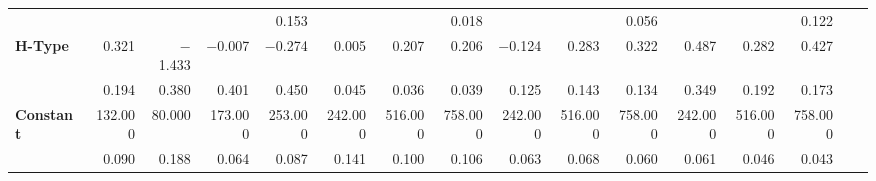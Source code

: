 \begin{tabular}{@{\extracolsep{5pt}}lrrrrrrrrrrrrrrr}
{\bf } & \phantom{***} & \phantom{***} & \phantom{***} & 0.153\phantom{\phantom{)}***} & \phantom{***} & \phantom{***} & 0.018\phantom{\phantom{)}***} & \phantom{***} & \phantom{***} & 0.056\phantom{\phantom{)}***} & \phantom{***} & \phantom{***} & 0.122\phantom{\phantom{)}***} \\
{\bf H-Type} & 0.321\phantom{\phantom{)}***} & $-$1.433\phantom{\phantom{)}***} & $-$0.007\phantom{\phantom{)}***} & $-$0.274\phantom{\phantom{)}***} & 0.005\phantom{\phantom{)}***} & 0.207\phantom{\phantom{)}***} & 0.206\phantom{\phantom{)}***} & $-$0.124\phantom{\phantom{)}***} & 0.283\phantom{\phantom{)}***} & 0.322\phantom{\phantom{)}***} & 0.487\phantom{\phantom{)}***} & 0.282\phantom{\phantom{)}***} & 0.427\phantom{\phantom{)}***} \\
{\bf } & 0.194\phantom{\phantom{)}***} & 0.380\phantom{\phantom{)}***} & 0.401\phantom{\phantom{)}***} & 0.450\phantom{\phantom{)}***} & 0.045\phantom{\phantom{)}***} & 0.036\phantom{\phantom{)}***} & 0.039\phantom{\phantom{)}***} & 0.125\phantom{\phantom{)}***} & 0.143\phantom{\phantom{)}***} & 0.134\phantom{\phantom{)}***} & 0.349\phantom{\phantom{)}***} & 0.192\phantom{\phantom{)}***} & 0.173\phantom{\phantom{)}***} \\
{\bf Constant} & 132.000\phantom{\phantom{)}***} & 80.000\phantom{\phantom{)}***} & 173.000\phantom{\phantom{)}***} & 253.000\phantom{\phantom{)}***} & 242.000\phantom{\phantom{)}***} & 516.000\phantom{\phantom{)}***} & 758.000\phantom{\phantom{)}***} & 242.000\phantom{\phantom{)}***} & 516.000\phantom{\phantom{)}***} & 758.000\phantom{\phantom{)}***} & 242.000\phantom{\phantom{)}***} & 516.000\phantom{\phantom{)}***} & 758.000\phantom{\phantom{)}***} \\
{\bf } & 0.090\phantom{***} & 0.188\phantom{***} & 0.064\phantom{***} & 0.087\phantom{***} & 0.141\phantom{***} & 0.100\phantom{***} & 0.106\phantom{***} & 0.063\phantom{***} & 0.068\phantom{***} & 0.060\phantom{***} & 0.061\phantom{***} & 0.046\phantom{***} & 0.043\phantom{***} \\
\hline
\end{tabular}
